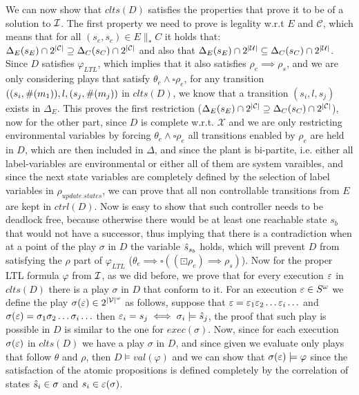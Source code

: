 We can now show that $clts(D)$ satisfies the properties that prove it to be of a solution to ${\mathcal{I}}$. The first property we need to prove is legality w.r.t $E$ and $\mathcal{C}$, which means that for all $(s_e,s_c) \in E \parallel_* C$ it holds that:
$\Delta_{E}(s_E)\cap 2^{|{\mathcal{C}}|} \supseteq \Delta_{C}(s_C)\cap 2^{|{\mathcal{C}}|}$ and also that  $\Delta_{E}(s_E)\cap 2^{|{\mathcal{U}}|} \subseteq \Delta_{C}(s_C)\cap 2^{|{\mathcal{U}}|}$. Since $D$ satisfies $\varphi_{LTL}$, which implies that it also satisfies $\rho_e \implies \rho_s$, and we are only considering plays that satisfy $\theta_e \wedge \square \rho_e$, for any transition $((s_i, \#(m_1)),l,(s_j,\#(m_j))$ in $clts(D)$, we know that a transition $(s_i, l, s_j)$ exists in $\Delta_E$. This proves the first restriction ($\Delta_{E}(s_E)\cap 2^{|{\mathcal{C}}|} \supseteq \Delta_{C}(s_C)\cap 2^{|{\mathcal{C}}|}$), now for the other part, since $D$ is complete w.r.t. $\mathcal{X}$ and we are only restricting environmental variables by forcing $\theta_e \wedge \square\rho_e$ all transitions enabled by $\rho_e$ are held in $D$, which are then included in $\Delta$, and since the plant is bi-partite, i.e. either all label-variables are environmental or either all of them are system varaibles, and since the next state variables are completely defined by the selection of label variables in $\rho_{update.states}$, we can prove that all non controllable transitions from $E$ are kept in $ctrl(D)$. Now is easy to show that such controller needs to be deadlock free, because otherwise there would be at least one reachable state $s_b$ that would not have a successor, thus implying that there is a contradiction when at a point of the play $\sigma$ in $D$ the variable $\hat{s}_{s_b}$ holds, which will prevent $D$ from satisfying the $\rho$ part of $\varphi_{LTL}$ ($\theta_e \implies \square((\boxdot \rho_e) \implies \rho_s)$).  
Now for the proper LTL formula $\varphi$ from ${\mathcal{I}}$, as we did before, we prove that for every execution ${\varepsilon}$ in $clts(D)$ there is a play $\sigma$ in $D$ that conform to it.
For an execution ${\varepsilon} \in S^{\omega}$ we define the play $\sigma({\varepsilon}) \in 2^{|\mathcal{V}|^{\omega}}$ as follows, suppose that ${\varepsilon}= {\varepsilon}_1 {\varepsilon}_2 \ldots {\varepsilon}_i \ldots$ and $\sigma({\varepsilon}) = \sigma_1 \sigma_2 \ldots \sigma_i \ldots$ 
 then ${\varepsilon}_i = s_j \iff \sigma_i \models \hat{s}_{j}$, the proof that such play is possible in $D$ is similar to the one for $exec(\sigma)$.
Now, since for each execution $\sigma({\varepsilon})$ in $clts(D)$ we have a play $\sigma$ in $D$, and since given we evaluate only plays that follow $\theta$ and $\rho$, then $D \models val(\varphi)$ and we can show that $\sigma({\varepsilon}) \models \varphi$ since the satisfaction of the atomic propositions is defined completely by the correlation of states $\hat{s}_{i} \in \sigma$ and $s_i \in {\varepsilon}(\sigma)$.